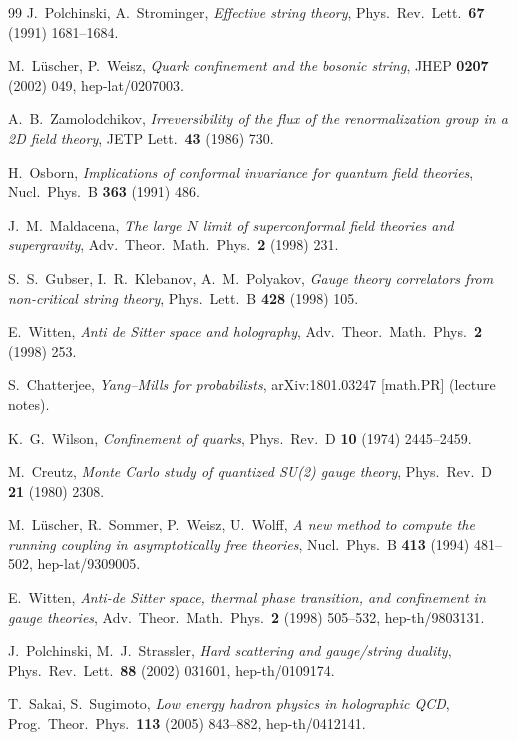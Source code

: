 {\begin{thebibliography}{99}
 J.~Polchinski, A.~Strominger, \emph{Effective string theory},
  Phys.\ Rev.\ Lett.\ \textbf{67} (1991) 1681--1684.

 M.~L\"uscher, P.~Weisz, \emph{Quark confinement and the bosonic string},
  JHEP \textbf{0207} (2002) 049, hep-lat/0207003.

 A.~B.~Zamolodchikov, \emph{Irreversibility of the flux of the
  renormalization group in a 2D field theory}, JETP Lett.\ \textbf{43} (1986) 730.

 H.~Osborn, \emph{Implications of conformal invariance for quantum field
  theories}, Nucl.\ Phys.\ B \textbf{363} (1991) 486.

 J.~M.~Maldacena, \emph{The large $N$ limit of superconformal field theories
  and supergravity}, Adv.\ Theor.\ Math.\ Phys.\ \textbf{2} (1998) 231.

 S.~S.~Gubser, I.~R.~Klebanov, A.~M.~Polyakov, \emph{Gauge theory correlators from
  non-critical string theory}, Phys.\ Lett.\ B \textbf{428} (1998) 105.

 E.~Witten, \emph{Anti de Sitter space and holography},
  Adv.\ Theor.\ Math.\ Phys.\ \textbf{2} (1998) 253.

 S.~Chatterjee, \emph{Yang--Mills for probabilists}, arXiv:1801.03247
  [math.PR] (lecture notes).

 K.~G.~Wilson, \emph{Confinement of quarks}, Phys.\ Rev.\ D \textbf{10} (1974)
  2445--2459.

 M.~Creutz, \emph{Monte Carlo study of quantized SU(2) gauge theory}, Phys.\
  Rev.\ D \textbf{21} (1980) 2308.

 M.~L\"uscher, R.~Sommer, P.~Weisz, U.~Wolff, \emph{A new method to
  compute the running coupling in asymptotically free theories}, Nucl.\ Phys.\ B \textbf{413}
  (1994) 481--502, hep-lat/9309005.

 E.~Witten, \emph{Anti-de Sitter space, thermal phase transition, and
  confinement in gauge theories}, Adv.\ Theor.\ Math.\ Phys.\ \textbf{2} (1998) 505--532,
  hep-th/9803131.

 J.~Polchinski, M.~J.~Strassler, \emph{Hard scattering and
  gauge/string duality}, Phys.\ Rev.\ Lett.\ \textbf{88} (2002) 031601, hep-th/0109174.

 T.~Sakai, S.~Sugimoto, \emph{Low energy hadron physics in holographic
  QCD}, Prog.\ Theor.\ Phys.\ \textbf{113} (2005) 843--882, hep-th/0412141.


\end{thebibliography}}
